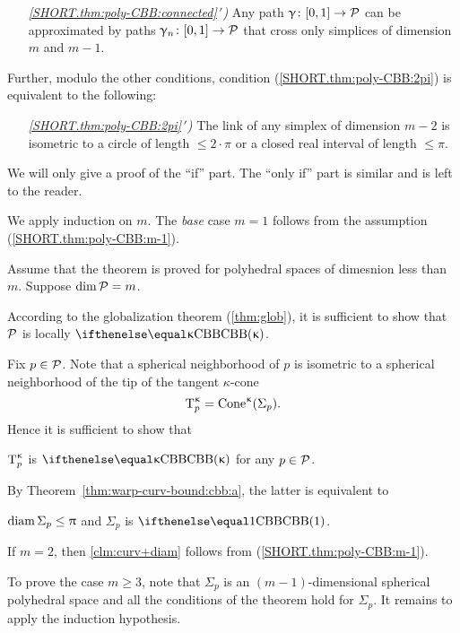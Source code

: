 \begin{itemize}
 \item[{\it \ref{SHORT.thm:poly-CBB:connected}$\,'\!$)}] 
Any path $\gamma\:[0,1]\to \spc{P}$ can be approximated by paths
$\gamma_n\:[0,1]\to \spc{P}$ 
that cross only simplices of dimension $m$ and $m-1$.
\end{itemize}

Further, modulo the other conditions,
 condition (\ref{SHORT.thm:poly-CBB:2pi})
is equivalent to the following:


\begin{itemize}
 \item[{\it \ref{SHORT.thm:poly-CBB:2pi}$\,'\!$)}] 
The link of any simplex of dimension $m-2$ is 
isometric to a circle of length $\le 2\cdot\pi$
or a closed real interval of length $\le \pi$.
\end{itemize}

We will only give a proof of the ``if'' part.
The ``only if'' part is similar and is left to the reader.

We apply induction on $m$.
The {}\emph{base} case $m=1$ follows from the assumption (\ref{SHORT.thm:poly-CBB:m-1}).

Assume that the theorem is proved for polyhedral spaces  of dimesnion less than $m$.
Suppose  $\mathop{\rm dim}\nolimits\mathcal{P}=m$.

According to the globalization theorem (\ref{thm:glob}),
it is sufficient to show that 
$\mathcal{P}$  is locally $\Alex\kappa$. 

Fix $p\in \spc{P}$.
Note that a spherical neighborhood of $p$
is isometric
to a  spherical neighborhood of the tip of the tangent $\kappa$-cone 
$$\T_p\mc\kappa\z
=
\Cone\mc\kappa(\Sigma_p).$$
Hence it is sufficient to show that 
\begin{clm}{}
 $\text{\rm T}_p^{\upkappa}$ is $\Alex\kappa$ for any $p\in \spc{P}$.
\end{clm}

By Theorem~\ref{thm:warp-curv-bound:cbb:a}, 
the latter is equivalent to 
\begin{clm}{}\label{clm:curv+diam}
$\diam\Sigma_p\le \pi$ and $\Sigma_p$ is $\Alex1$.
\end{clm}


If $m=2$, then \ref{clm:curv+diam} follows from (\ref{SHORT.thm:poly-CBB:m-1}).

To prove the case $m\ge 3$,
note that $\Sigma_p$ is an $(m-1)$-dimensional spherical polyhedral space and all the conditions of the theorem hold for $\Sigma_p$.
It remains to apply the induction hypothesis.\qeds

